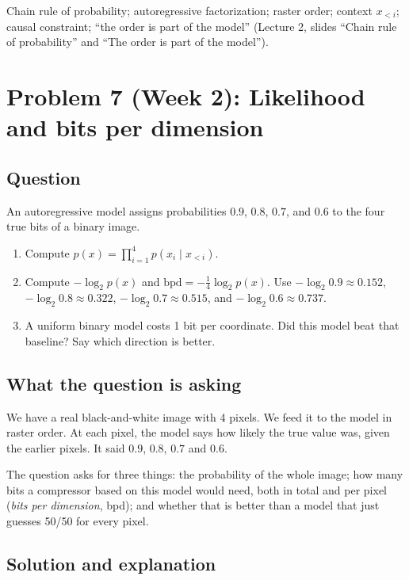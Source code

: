 \documentclass[12pt,a4paper]{article}
\begin{document}
Chain rule of probability; autoregressive factorization; raster order; context $x_{<i}$; causal constraint; ``the order is part of the model'' (Lecture 2, slides ``Chain rule of probability'' and ``The order is part of the model'').

\section{Problem 7 (Week 2): Likelihood and bits per dimension}

\subsection{Question}

An autoregressive model assigns probabilities $0.9$, $0.8$, $0.7$, and $0.6$ to the four true bits of a binary image.

\begin{enumerate}[leftmargin=*]
\item Compute $p(x) = \prod_{i=1}^{4} p(x_i \mid x_{<i})$.
\item Compute $-\log_2 p(x)$ and $\mathrm{bpd} = -\frac{1}{4}\log_2 p(x)$. Use $-\log_2 0.9 \approx 0.152$, $-\log_2 0.8 \approx 0.322$, $-\log_2 0.7 \approx 0.515$, and $-\log_2 0.6 \approx 0.737$.
\item A uniform binary model costs 1 bit per coordinate. Did this model beat that baseline? Say which direction is better.
\end{enumerate}

\subsection{What the question is asking}

We have a real black-and-white image with 4 pixels. We feed it to the model in raster order. At each pixel, the model says how likely the true value was, given the earlier pixels. It said $0.9$, $0.8$, $0.7$ and $0.6$.

The question asks for three things: the probability of the whole image; how many bits a compressor based on this model would need, both in total and per pixel (\emph{bits per dimension}, bpd); and whether that is better than a model that just guesses 50/50 for every pixel.

\subsection{Solution and explanation}
\end{document}
